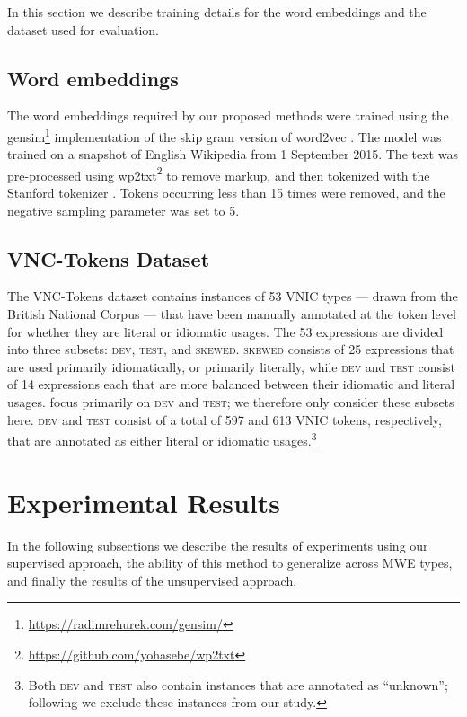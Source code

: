 \documentclass[11pt]{article}
\newcommand{\VNIC}{VNIC\xspace}
\newcommand{\dev}{\textsc{dev}\xspace}
\newcommand{\test}{\textsc{test}\xspace}
\newcommand{\skewed}{\textsc{skewed}\xspace}
\begin{document}
In this section we describe training details for the word embeddings
and the dataset used for evaluation.

\subsection{Word embeddings}

The word embeddings required by our proposed methods were trained
using the gensim\footnote{\url{https://radimrehurek.com/gensim/}}
implementation of the skip gram version of word2vec
\citep{Mikolov+:2013b}. The model was trained on a snapshot of English
Wikipedia from 1 September 2015. The text was pre-processed using
wp2txt\footnote{\url{https://github.com/yohasebe/wp2txt}} to remove
markup, and then tokenized with the Stanford tokenizer
\citep{manning-EtAl:2014:P14-5}. Tokens occurring less than 15 times
were removed, and the negative sampling parameter was set to 5.

\subsection{VNC-Tokens Dataset}

The VNC-Tokens dataset \citep{Cook2008} contains instances of 53 \VNIC
types --- drawn from the British National Corpus \citep{Burnard2007}
--- that have been manually annotated at the token level for whether
they are literal or idiomatic usages. The 53 expressions are divided
into three subsets: \dev, \test, and \skewed. \skewed consists of 25
expressions that are used primarily idiomatically, or primarily
literally, while \dev and \test consist of 14 expressions each that
are more balanced between their idiomatic and literal
usages. \cite{Fazly2009} focus primarily on \dev and \test; we
therefore only consider these subsets here. \dev and \test consist of
a total of 597 and 613 \VNIC tokens, respectively, that are annotated
as either literal or idiomatic usages.\footnote{Both \dev and \test
  also contain instances that are annotated as ``unknown''; following
  \cite{Fazly2009} we exclude these instances from our study.}


\section{Experimental Results}

In the following subsections we describe the results of experiments
using our supervised approach, the ability of this method to
generalize across MWE types, and finally the results of the
unsupervised approach.
\end{document}
